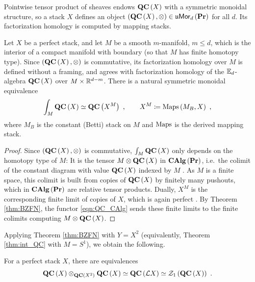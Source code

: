Pointwise tensor product of sheaves endows $\mathbf{QC}\left(X\right)$ with a symmetric monoidal structure, so
a stack $X$ defines an object
$\left(\mathbf{QC}\left(X\right) , \otimes\right)\in\mathfrak{u}\mathsf{Mor}_d\left(\mathbf{Pr}\right)$ for all $d$.
Its factorization homology is computed by mapping stacks.

\begin{theorem}
\label{thm:int_QC}
Let $X$ be a perfect stack, and let $M$ be a smooth $m$-manifold, $m\leq d$, which is the
interior of a compact manifold with boundary (so that $M$ has finite homotopy type). Since
$\left(\mathbf{QC}\left(X\right),\otimes\right)$ is commutative, its factorization homology over $M$ is
defined without a framing, and agrees with factorization homology of the $\mathbb{E}_d$-algebra
$\mathbf{QC}\left(X\right)$ over $M\times\mathbb{R}^{d-m}$. There is a natural symmetric monoidal
equivalence
\begin{equation}
\int_M \mathbf{QC}\left(X\right) \simeq \mathbf{QC}\left(X^M\right) \ ,
\qquad X^M\coloneqq\operatorname{Maps}\left(M_B , X\right) \ ,
\label{eqn:int_QC}
\end{equation}
where $M_B$ is the constant (Betti) stack on $M$ and $\operatorname{Maps}$ is the derived mapping stack.
\end{theorem}

\begin{proof}
Since $\left(\mathbf{QC}\left(X\right),\otimes\right)$ is commutative, $\int_M\mathbf{QC}\left(X\right)$ only
depends on the homotopy type of $M$: It is the tensor $M\otimes\mathbf{QC}\left(X\right)$ in
$\mathbf{CAlg}\left(\mathbf{Pr}\right)$, i.e.\ the colimit of the constant diagram with value
$\mathbf{QC}\left(X\right)$ indexed by $M$ \cite[Section 5.5]{L:HA}.
As $M$ is a finite space, this colimit is built from copies of $\mathbf{QC}\left(X\right)$ by finitely
many pushouts, which in $\mathbf{CAlg}\left(\mathbf{Pr}\right)$ are relative tensor products.
Dually, $X^M$ is the corresponding finite limit of copies of $X$, which is again perfect
\cite[\S 3]{BZFN}.
By Theorem \ref{thm:BZFN}, the functor \eqref{eqn:QC_CAlg} sends these finite limits to the
finite colimits computing $M\otimes\mathbf{QC}\left(X\right)$.
\end{proof}

Applying Theorem \ref{thm:BZFN} with $Y = X^2$ (equivalently, Theorem \ref{thm:int_QC} with
$M = S^1$), we obtain the following.

\begin{theorem}
\label{thm:BZFN_loops}
For a perfect stack $X$, there are equivalences
\begin{equation*}
\mathbf{QC}\left(X\right) \otimes_{\mathbf{QC}\left(X^2\right)} \mathbf{QC}\left(X\right)
\simeq \mathbf{QC}\left(\mathcal{L}X\right) \simeq
\mathcal{Z}_1\left(\mathbf{QC}\left(X\right) \right) \ .
\end{equation*}
\end{theorem}

